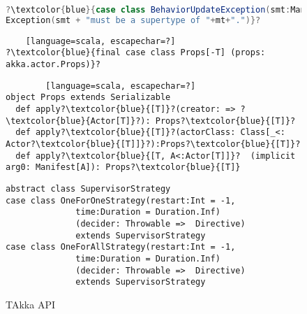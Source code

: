 \begin{figure}[!h]
\begin{lstlisting}[language=scala, escapechar=?]
?\textcolor{blue}{case class BehaviorUpdateException(smt:Manifest[\_],  mt:Manifest[\_]) extends \ 
Exception(smt + "must be a supertype of "+mt+".")}?
    \end{lstlisting}
    
    \begin{lstlisting}    [language=scala, escapechar=?]
?\textcolor{blue}{final case class Props[-T] (props: akka.actor.Props)}?
    \end{lstlisting}
    \begin{lstlisting}        [language=scala, escapechar=?]
object Props extends Serializable
  def apply?\textcolor{blue}{[T]}?(creator: => ?\textcolor{blue}{Actor[T]}?): Props?\textcolor{blue}{[T]}?
  def apply?\textcolor{blue}{[T]}?(actorClass: Class[_<: Actor?\textcolor{blue}{[T]]}?):Props?\textcolor{blue}{[T]}?
  def apply?\textcolor{blue}{[T, A<:Actor[T]]}?  (implicit arg0: Manifest[A]): Props?\textcolor{blue}{[T]}
    \end{lstlisting}
    
    \begin{lstlisting}    
abstract class SupervisorStrategy
case class OneForOneStrategy(restart:Int = -1, 
              time:Duration = Duration.Inf)
              (decider: Throwable =>  Directive) 
              extends SupervisorStrategy
case class OneForAllStrategy(restart:Int = -1, 
              time:Duration = Duration.Inf)
              (decider: Throwable =>  Directive) 
              extends SupervisorStrategy
    \end{lstlisting}
    
    \caption{TAkka API}
\end{figure}